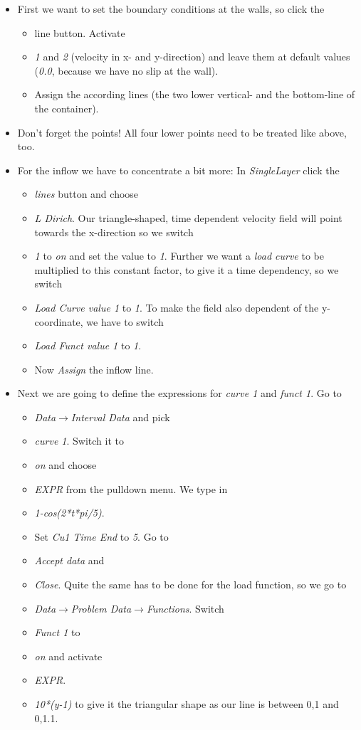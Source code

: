 \begin{itemize}
\item First we want to set the boundary conditions at the walls, so click the

\begin{itemize}
\item line button. Activate 
\item \emph{1} and \emph{2} (velocity in x- and y-direction) and leave them
at default values (\emph{0.0}, because we have no slip at the wall).
\item Assign the according lines (the two lower vertical- and the bottom-line
of the container). 
\end{itemize}
\item Don't forget the points! All four lower points need to be treated
like above, too.
\item For the inflow we have to concentrate a bit more: In \emph{SingleLayer}
click the

\begin{itemize}
\item \emph{lines} button and choose 
\item \emph{L Dirich}. Our triangle-shaped, time dependent velocity field
will point towards the x-direction so we switch 
\item \emph{1} to \emph{on} and set the value to \emph{1}. Further we want
a \emph{load curve} to be multiplied to this constant factor, to give
it a time dependency, so we switch 
\item \emph{Load Curve value 1} to \emph{1}. To make the field also dependent
of the y-coordinate, we have to switch 
\item \emph{Load Funct value 1} to \emph{1}. 
\item Now \emph{Assign} the inflow line.
\end{itemize}
\item Next we are going to define the expressions for \emph{curve 1} and
\emph{funct 1}. Go to 

\begin{itemize}
\item \emph{Data$\to$Interval Data} and pick
\item \emph{curve 1}. Switch it to 
\item \emph{on} and choose 
\item \emph{EXPR} from the pulldown menu. We type in 
\item \emph{1-cos(2{*}t{*}pi/5)}. 
\item Set \emph{Cu1 Time End} to \emph{5}. Go to 
\item \emph{Accept data} and 
\item \emph{Close}. Quite the same has to be done for the load function,
so we go to 
\item \emph{Data$\to$Problem Data$\to$Functions}. Switch 
\item \emph{Funct 1} to 
\item \emph{on} and activate 
\item \emph{EXPR}. 
\item \emph{10{*}(y-1)} to give it the triangular shape as our line is between
0,1 and 0,1.1. 
\end{itemize}
\end{itemize}

